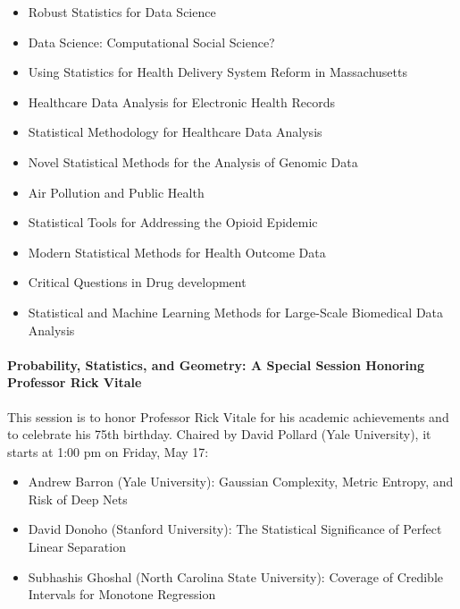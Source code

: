 \documentclass[12pt]{article}
\begin{document}
\begin{itemize}
\item
  Robust Statistics for Data Science

\item
  Data Science: Computational Social Science?

\item
  Using Statistics for Health Delivery System Reform in Massachusetts
\item
  Healthcare Data Analysis for Electronic Health Records
\item
  Statistical Methodology for Healthcare Data Analysis
\item
  Novel Statistical Methods for the Analysis of Genomic Data
\item
  Air Pollution and Public Health %
\item
  Statistical Tools for Addressing the Opioid Epidemic
\item
  Modern Statistical Methods for Health Outcome Data
\item
  Critical Questions in Drug development
\item
  Statistical and Machine Learning Methods for Large-Scale Biomedical
  Data Analysis
\end{itemize}



\paragraph{Probability, Statistics, and Geometry: A Special Session
  Honoring Professor Rick Vitale}
This session is to honor Professor Rick Vitale for
his academic achievements and to celebrate his 75th birthday.
Chaired by \textsf{David Pollard} (Yale University),
it starts at 1:00 pm on Friday, May 17:
\begin{itemize}
\item
\textsf{Andrew Barron} (Yale University): Gaussian Complexity, Metric
Entropy, and Risk of Deep Nets
\item
\textsf{David Donoho}  (Stanford University): The Statistical
Significance of Perfect Linear Separation
\item
\textsf{Subhashis Ghoshal} (North Carolina State University): Coverage
of Credible Intervals for Monotone Regression
\end{itemize}
\end{document}
